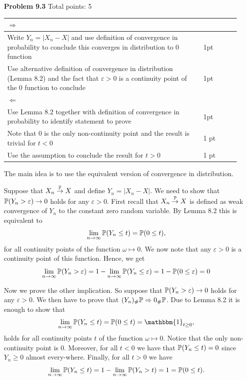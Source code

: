 \documentclass{lecturenotes}
\newcommand{\rubric}[1]{#1}
\begin{document}
\textbf{Problem 9.3}\rubric{ Total points: 5 \hfill

\begin{tabular}{p{0.8\linewidth}p{0.15\linewidth}}
\hline
$\Rightarrow$ & \\
\hline
Write $Y_n = |X_n - X|$ and use definition of convergence in probability to conclude this converges in distribution to $0$ function & 1pt\\
Use alternative definition of convergence in distribution (Lemma 8.2) and the fact that $\varepsilon > 0$ is a continuity point of the $0$ function to conclude & 1pt\\
\hline
$\Leftarrow$ & \\
\hline 
Use Lemma 8.2 together with definition of convergence in probability to identify statement to prove & 1pt\\
Note that $0$ is the only non-continuity point and the result is trivial for $t < 0$ & 1 pt\\
Use the assumption to conclude the result for $t > 0$ & 1 pt\\
\hline
\end{tabular}

}

The main idea is to use the equivalent version of convergence in distribution.

Suppose that $X_n \stackrel{\mathbb P}{\rightarrow} X$ and define $Y_n = |X_n - X|$. We need to show that $\mathbb P(Y_n > \varepsilon) \to 0$ holds for any $\varepsilon > 0$. First recall that $X_n \stackrel{\mathbb P}{\rightarrow} X$ is defined as weak convergence of $Y_n$ to the constant zero random variable. By Lemma 8.2 this is equivalent to 
\[
	\lim_{n \to \infty} \mathbb P(Y_n \le t) = \mathbb P(0 \le t),
\]
for all continuity points of the function $\omega \mapsto 0$. We now note that any $\varepsilon > 0$ is a continuity point of this function. Hence, we get
\[
	\lim_{n \to \infty} \mathbb P(Y_n > \varepsilon) = 1 - \lim_{n \to \infty} \mathbb P(Y_n \le \varepsilon) = 1 - \mathbb P(0 \le \varepsilon) = 0
\]

Now we prove the other implication. So suppose that $\mathbb P(Y_n > \varepsilon) \to 0$ holds for any $\varepsilon > 0$. We then have to prove that $(Y_n)_\# \mathbb P \Rightarrow 0_\# \mathbb P$. Due to Lemma 8.2 it is enough to show that
\[
	\lim_{n \to \infty} \bbP(Y_n \le t) = \bbP(0 \le t) = \mathbbm{1}_{t \ge 0},
\]
holds for all continuity points $t$ of the function $\omega \mapsto 0$. Notice that the only non-continuity point is $0$. Moreover, for all $t < 0$ we have that $\mathbb P(Y_n \le t) = 0$ since $Y_n \ge 0$ almost every-where. Finally, for all $t > 0$ we have
\[
	\lim_{n \to \infty} \mathbb P(Y_n \le t) = 1 - \lim_{n \to \infty} \mathbb P(Y_n > t) = 1 = \mathbb P(0 \le t). 
\]
\end{document}
